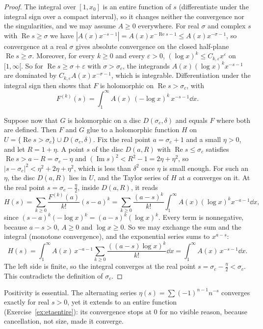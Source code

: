 \begin{proof}
The integral over $[1,x_0]$ is an entire function of $s$ (differentiate under the integral sign over a compact interval), so it changes neither the
convergence nor the singularities, and we may assume $A\ge0$ everywhere. For real $\sigma$ and complex $s$ with $\operatorname{Re}s\ge\sigma$ we have
$|A(x)x^{-s-1}|=A(x)x^{-\operatorname{Re}s-1}\le A(x)x^{-\sigma-1}$, so convergence at a real $\sigma$ gives absolute convergence on the closed half-plane
$\operatorname{Re}s\ge\sigma$. Moreover, for every $k\ge0$ and every $\varepsilon>0$, $(\log x)^k\le C_{k,\varepsilon}x^\varepsilon$ on $[1,\infty[$. So for
$\operatorname{Re}s\ge\sigma+\varepsilon$ with $\sigma>\sigma_c$, the integrands $A(x)(\log x)^kx^{-s-1}$ are dominated by $C_{k,\varepsilon}A(x)x^{-\sigma-1}$,
which is integrable. Differentiation under the integral sign then shows that $F$ is holomorphic on $\operatorname{Re}s>\sigma_c$, with
\[
F^{(k)}(s)=\int_1^\infty A(x)\,(-\log x)^k\,x^{-s-1}\dd x.
\]

Suppose now that $G$ is holomorphic on a disc $D(\sigma_c,\delta)$ and equals $F$ where both are defined. Then $F$ and $G$ glue to a holomorphic function $H$ on
$U=\{\operatorname{Re}s>\sigma_c\}\cup D(\sigma_c,\delta)$. Fix the real point $a=\sigma_c+1$ and a small $\eta>0$, and let $R=1+\eta$. A point $s$ of the disc
$D(a,R)$ with $\operatorname{Re}s\le\sigma_c$ satisfies $\operatorname{Re}s>a-R=\sigma_c-\eta$ and $(\operatorname{Im}s)^2<R^2-1=2\eta+\eta^2$, so
$|s-\sigma_c|^2<\eta^2+2\eta+\eta^2$, which is less than $\delta^2$ once $\eta$ is small enough. For such an $\eta$, the disc $D(a,R)$ lies in $U$, and the Taylor
series of $H$ at $a$ converges on it. At the real point $s=\sigma_c-\frac\eta2$, inside $D(a,R)$, it reads
\[
H(s)=\sum_{k\ge0}\frac{F^{(k)}(a)}{k!}(s-a)^k=\sum_{k\ge0}\frac{(a-s)^k}{k!}\int_1^\infty A(x)(\log x)^kx^{-a-1}\dd x,
\]
since $(s-a)^k(-\log x)^k=(a-s)^k(\log x)^k$. Every term is nonnegative, because $a-s>0$, $A\ge0$ and $\log x\ge0$. So we may exchange the sum and the integral
(monotone convergence), and the exponential series sums to $x^{a-s}$:
\[
H(s)=\int_1^\infty A(x)\,x^{-a-1}\sum_{k\ge0}\frac{((a-s)\log x)^k}{k!}\dd x=\int_1^\infty A(x)\,x^{-s-1}\dd x.
\]
The left side is finite, so the integral converges at the real point $s=\sigma_c-\frac\eta2<\sigma_c$. This contradicts the definition of $\sigma_c$.
\end{proof}

Positivity is essential. The alternating series $\eta(s)=\sum(-1)^{n-1}n^{-s}$ converges exactly for real $s>0$, yet it extends to an entire function
(Exercise~\ref{ex:etaentire}): its convergence stops at $0$ for no visible reason, because cancellation, not size, made it converge.

